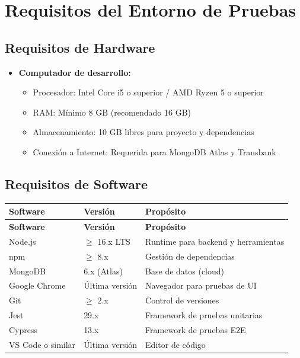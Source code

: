 \documentclass[12pt,a4paper]{article}
\begin{document}
\section{Requisitos del Entorno de Pruebas}

\subsection{Requisitos de Hardware}

\begin{itemize}
    \item \textbf{Computador de desarrollo:}
    \begin{itemize}
        \item Procesador: Intel Core i5 o superior / AMD Ryzen 5 o superior
        \item RAM: Mínimo 8 GB (recomendado 16 GB)
        \item Almacenamiento: 10 GB libres para proyecto y dependencias
        \item Conexión a Internet: Requerida para MongoDB Atlas y Transbank
    \end{itemize}
\end{itemize}

\subsection{Requisitos de Software}

\begin{longtable}{|p{4cm}|p{3cm}|p{7cm}|}
\hline
\textbf{Software} & \textbf{Versión} & \textbf{Propósito} \\
\hline
\endfirsthead
\hline
\textbf{Software} & \textbf{Versión} & \textbf{Propósito} \\
\hline
\endhead
Node.js & $\geq$ 16.x LTS & Runtime para backend y herramientas \\
\hline
npm & $\geq$ 8.x & Gestión de dependencias \\
\hline
MongoDB & 6.x (Atlas) & Base de datos (cloud) \\
\hline
Google Chrome & Última versión & Navegador para pruebas de UI \\
\hline
Git & $\geq$ 2.x & Control de versiones \\
\hline
Jest & 29.x & Framework de pruebas unitarias \\
\hline
Cypress & 13.x & Framework de pruebas E2E \\
\hline
VS Code o similar & Última versión & Editor de código \\
\hline
\end{longtable}
\end{document}
